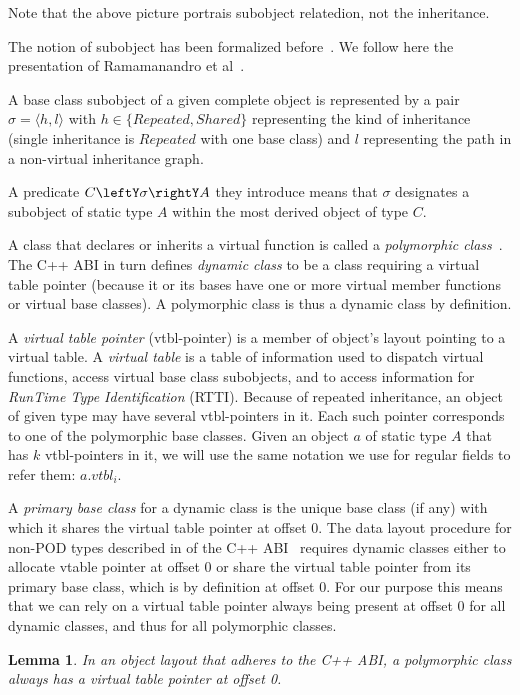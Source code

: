 \documentclass[preprint]{sigplanconf}
\newtheorem{lemma}{Lemma}
\begin{document}
\noindent
Note that the above picture portrais subobject relatedion, not the inheritance.

The notion of subobject has been formalized before~\cite{RF95,WNST06,RDL11}.
We follow here the presentation of Ramamanandro et al~\cite{RDL11}.

A base class subobject of a given complete object is represented by a pair 
$\sigma = \langle h,l\rangle$ with $h \in \{Repeated,Shared\}$ representing the 
kind of inheritance (single inheritance is $Repeated$ with one base class) and $l$ 
representing the path in a non-virtual inheritance graph.

A predicate $C\leftY\sigma\rightY A$ they introduce means that $\sigma$ 
designates a subobject of static type $A$ within the most derived object of 
type $C$.

A class that declares or inherits a virtual function is called a 
\emph{polymorphic class}~\cite[]{C++0x}. The C++ ABI in turn defines 
\emph{dynamic class} to be a class requiring a virtual table pointer (because it 
or its bases have one or more virtual member functions or virtual base classes). 
A polymorphic class is thus a dynamic class by definition.

A \emph{virtual table pointer} (vtbl-pointer) is a member of object's layout 
pointing to a virtual table. A \emph{virtual table} is a table of information used 
to dispatch virtual functions, access virtual base class subobjects, and to 
access information for \emph{RunTime Type Identification} (RTTI). Because of repeated
inheritance, an object of given type may have several vtbl-pointers in it. Each 
such pointer corresponds to one of the polymorphic base classes. Given an object 
$a$ of static type $A$ that has $k$ vtbl-pointers in it, we will use the same 
notation we use for regular fields to refer them: $a.vtbl_i$.

A \emph{primary base class} for a dynamic class is the unique base class (if any) 
with which it shares the virtual table pointer at offset 0. The data layout 
procedure for non-POD types described in  of the C++ ABI~\cite{C++ABI} 
requires dynamic classes either to allocate vtable pointer at offset 0 or share 
the virtual table pointer from its primary base class, which is by definition at 
offset 0. For our purpose this means that we can rely on a virtual table pointer 
always being present at offset 0 for all dynamic classes, and thus for all polymorphic 
classes.

\begin{lemma}
In an object layout that adheres to the C++ ABI, a polymorphic class always has a 
virtual table pointer at offset 0.
\label{lem:vtbl}
\end{lemma}
\end{document}
